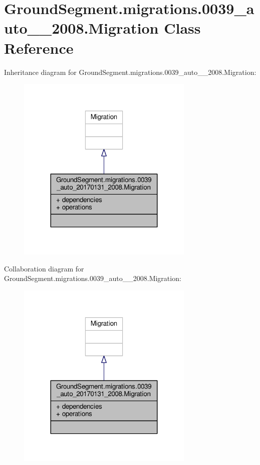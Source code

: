 \hypertarget{class_ground_segment_1_1migrations_1_10039__auto__20170131__2008_1_1_migration}{}\section{Ground\+Segment.\+migrations.0039\+\_\+auto\+\_\+\_\+2008.Migration Class Reference}
\label{class_ground_segment_1_1migrations_1_10039__auto__20170131__2008_1_1_migration}


Inheritance diagram for Ground\+Segment.\+migrations.0039\+\_\+auto\+\_\+\_\+2008.Migration\+:\nopagebreak
\begin{figure}[H]
\begin{center}
\leavevmode
\includegraphics[width=239pt]{class_ground_segment_1_1migrations_1_10039__auto__20170131__2008_1_1_migration__inherit__graph}
\end{center}
\end{figure}


Collaboration diagram for Ground\+Segment.\+migrations.0039\+\_\+auto\+\_\+\_\+2008.Migration\+:\nopagebreak
\begin{figure}[H]
\begin{center}
\leavevmode
\includegraphics[width=239pt]{class_ground_segment_1_1migrations_1_10039__auto__20170131__2008_1_1_migration__coll__graph}
\end{center}
\end{figure}
